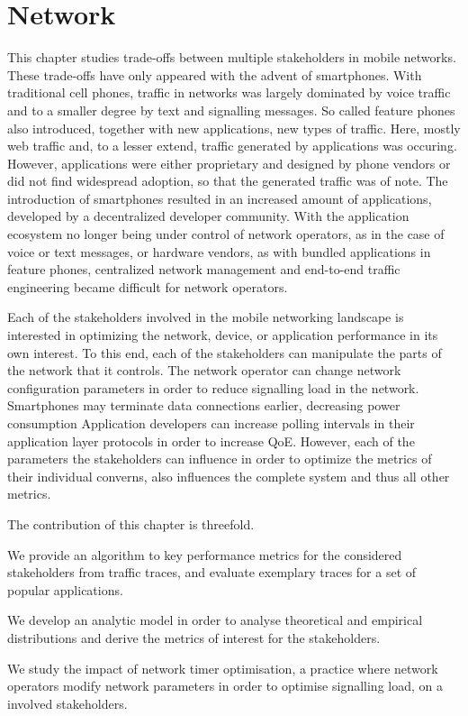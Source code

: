 \chapter{Network}\label{chap:network}
This chapter studies trade-offs between multiple stakeholders in mobile networks.
These trade-offs have only appeared with the advent of smartphones.
With traditional cell phones, traffic in networks was largely dominated by voice traffic and to a smaller degree by text and signalling messages.
So called feature phones also introduced, together with new applications, new types of traffic.
Here, mostly web traffic and, to a lesser extend, traffic generated by applications was occuring.
However, applications were either proprietary and designed by phone vendors or did not find widespread adoption, so that the generated traffic was of note.
The introduction of smartphones resulted in an increased amount of applications, developed by a decentralized developer community.
With the application ecosystem no longer being under control of network operators, as in the case of voice or text messages, or hardware vendors, as with bundled applications in feature phones, centralized network management and end-to-end traffic engineering became difficult for network operators.

Each of the stakeholders involved in the mobile networking landscape is interested in optimizing the network, device, or application performance in its own interest.
To this end, each of the stakeholders can manipulate the parts of the network that it controls.
The network operator can change network configuration parameters in order to reduce signalling load in the network.
Smartphones may terminate data connections earlier, decreasing power consumption
Application developers can increase polling intervals in their application layer protocols in order to increase \gls{QoE}.	
However, each of the parameters the stakeholders can influence in order to optimize the metrics of their individual converns, also influences the complete system and thus all other metrics.

The contribution of this chapter is threefold.
\begin{enumerate*}
\item We provide an algorithm to key performance metrics for the considered stakeholders from traffic traces, and evaluate exemplary traces for a set of popular applications.
\item We develop an analytic model in order to analyse theoretical and empirical distributions and derive the metrics of interest for the stakeholders.
\item We study the impact of network timer optimisation, a practice where network operators modify network parameters in order to optimise signalling load, on a involved stakeholders.
\end{enumerate*}


